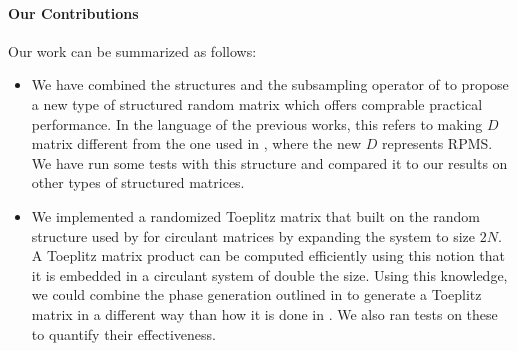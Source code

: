 \paragraph{Our Contributions}
Our work can be summarized as follows:
\begin{itemize}
	\item We have combined the structures \cite{doetal} and the subsampling operator 
		of \cite{romberg2009} to propose a new type of structured random matrix which offers 
		comprable practical performance. In the language of the previous works, this refers
		to making $D$ matrix different from the one used in \cite{doetal}, where the new $D$
		represents RPMS. We have run some tests with this structure and compared it to 
		our results on other types of structured matrices.
	\item We implemented a randomized Toeplitz matrix that built on the random structure
		used by \cite{romberg2009} for circulant matrices by expanding the system to size
		$2N$. A Toeplitz matrix product can be computed efficiently using this notion that 
		it is embedded in a circulant system of double the size. Using this knowledge, we 
		could combine the phase generation outlined in \cite{romberg2009} to generate a 
		Toeplitz matrix in a different way than how it is done in \cite{wotao}. We also ran 
		tests on these to quantify their effectiveness. 
\end{itemize}
